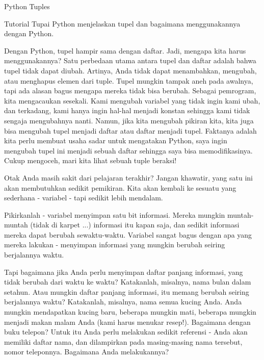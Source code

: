  \hspace*{0.5in} \vspace{12pt}
Python Tuples \par
Tutorial Tupai Python menjelaskan tupel dan bagaimana menggunakannya dengan Python. \par
Dengan Python, tupel hampir sama dengan daftar. Jadi, mengapa kita harus menggunakannya? Satu perbedaan utama antara tupel dan daftar adalah bahwa tupel tidak dapat diubah. Artinya, Anda tidak dapat menambahkan, mengubah, atau menghapus elemen dari tuple. Tupel mungkin tampak aneh pada awalnya, tapi ada alasan bagus mengapa mereka tidak bisa berubah. Sebagai pemrogram, kita mengacaukan sesekali. Kami mengubah variabel yang tidak ingin kami ubah, dan terkadang, kami hanya ingin hal-hal menjadi konstan sehingga kami tidak sengaja mengubahnya nanti. Namun, jika kita mengubah pikiran kita, kita juga bisa mengubah tupel menjadi daftar atau daftar menjadi tupel. Faktanya adalah kita perlu membuat usaha sadar untuk mengatakan Python, saya ingin mengubah tupel ini menjadi sebuah daftar sehingga saya bisa memodifikasinya. Cukup mengoceh, mari kita lihat sebuah tuple beraksi! \par
Otak Anda masih sakit dari pelajaran terakhir? Jangan khawatir, yang satu ini akan membutuhkan sedikit pemikiran. Kita akan kembali ke sesuatu yang sederhana - variabel - tapi sedikit lebih mendalam. \par
\vspace{12pt}
Pikirkanlah - variabel menyimpan satu bit informasi. Mereka mungkin muntah-muntah (tidak di karpet ...) informasi itu kapan saja, dan sedikit informasi mereka dapat berubah sewaktu-waktu. Variabel sangat bagus dengan apa yang mereka lakukan - menyimpan informasi yang mungkin berubah seiring berjalannya waktu. \par
\vspace{12pt}
Tapi bagaimana jika Anda perlu menyimpan daftar panjang informasi, yang tidak berubah dari waktu ke waktu? Katakanlah, misalnya, nama bulan dalam setahun. Atau mungkin daftar panjang informasi, itu memang berubah seiring berjalannya waktu? Katakanlah, misalnya, nama semua kucing Anda. Anda mungkin mendapatkan kucing baru, beberapa mungkin mati, beberapa mungkin menjadi makan malam Anda (kami harus menukar resep!). Bagaimana dengan buku telepon? Untuk itu Anda perlu melakukan sedikit referensi - Anda akan memiliki daftar nama, dan dilampirkan pada masing-masing nama tersebut, nomor teleponnya. Bagaimana Anda melakukannya? \par
